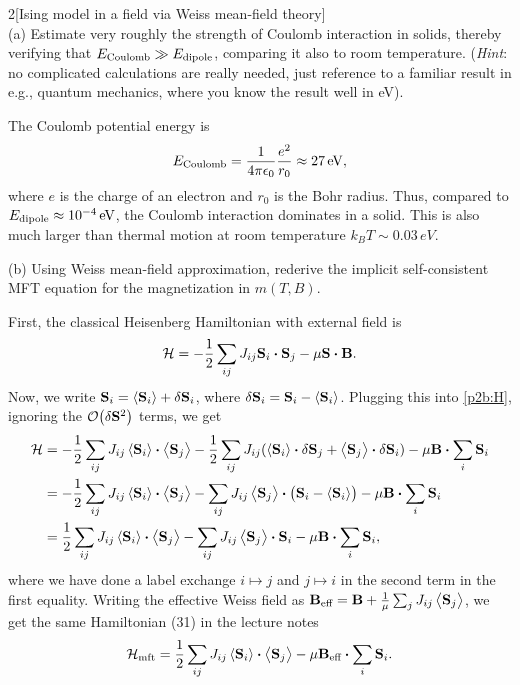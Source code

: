 \documentclass[12pt]{article}
\begin{document}
\begin{problem}{2}[Ising model in a field via Weiss mean-field theory]~\\

(a) Estimate very roughly the strength of Coulomb interaction in solids, thereby
verifying that $E_\t{Coulomb}\gg E_\t{dipole}$, comparing it also to room
temperature. (\textit{Hint}: no complicated calculations are really needed, just
reference to a familiar result in e.g., quantum mechanics, where you know the
result well in \si{eV}).
\begin{solution}
The Coulomb potential energy is
\begin{equation}
    E_\t{Coulomb}=\frac1{4\pi\epsilon_0}\frac{e^2}{r_0}\approx 27\,\si{eV},
\end{equation}
where $e$ is the charge of an electron and $r_0$ is the Bohr radius. Thus,
compared to $E_\t{dipole}\approx10^{-4}\,\si{eV}$, the Coulomb interaction
dominates in a solid. This is also much larger than thermal motion at room
temperature $k_BT\sim0.03\,\si{eV}$.
\end{solution}

(b) Using Weiss mean-field approximation, rederive the implicit self-consistent
MFT equation for the magnetization in $m(T,B)$.
\begin{solution}
First, the classical Heisenberg Hamiltonian with external field is
\begin{equation}\label{p2b:H}
    \HH=-\frac12\sum_{ij}J_{ij}\vb{S}_i\vdot\vb{S}_j-\mu\vb{S}\vdot\vb{B}.
\end{equation}
Now, we write $\vb{S}_i=\expval{\vb{S}_i}+\delta\vb{S}_i$, where
$\delta\vb{S}_i=\vb{S}_i-\expval{\vb{S}_i}$. Plugging this into \eqref{p2b:H},
ignoring the $\order{\delta\vb{S}^2}$ terms, we get
\begin{align}
    \HH
    &=-\frac12\sum_{ij}J_{ij}\expval{\vb{S}_i}\vdot\expval{\vb{S}_j}
    -\frac12\sum_{ij}J_{ij}(\expval{\vb{S}_i}\vdot\delta\vb{S}_j+\expval{\vb{S}_j}\vdot\delta\vb{S}_i)-\mu\vb{B}\vdot\sum_i\vb{S}_i\notag\\
    &=-\frac12\sum_{ij}J_{ij}\expval{\vb{S}_i}\vdot\expval{\vb{S}_j}
    -\sum_{ij}J_{ij}\expval{\vb{S}_j}\vdot\qty(\vb{S}_i-\expval{\vb{S}_i})
    -\mu\vb{B}\vdot\sum_i\vb{S}_i\notag\\
    &=\frac12\sum_{ij}J_{ij}\expval{\vb{S}_i}\vdot\expval{\vb{S}_j}
    -\sum_{ij}J_{ij}\expval{\vb{S}_j}\vdot\vb{S}_i-\mu\vb{B}\vdot\sum_i\vb{S}_i,
\end{align}
where we have done a label exchange $i\mapsto j$ and $j\mapsto i$ in the second
term in the first equality. Writing the effective Weiss field as
$\vb{B}_\t{eff}=\vb{B}+\frac1\mu\sum_jJ_{ij}\expval{\vb{S}_j}$, we get the same
Hamiltonian (31) in the lecture notes
\begin{equation}
    \HH_\t{mft}=\frac12\sum_{ij}J_{ij}\expval{\vb{S}_i}\vdot\expval{\vb{S}_j}-\mu\vb{B}_\t{eff}\vdot\sum_i\vb{S}_i.
\end{equation}


\end{solution}
\end{problem}
\end{document}
